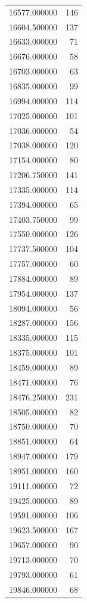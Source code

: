 \begin{tabular}{lr}
16577.000000  &   146 \\
16604.500000  &   137 \\
16633.000000  &    71 \\
16676.000000  &    58 \\
16703.000000  &    63 \\
16835.000000  &    99 \\
16994.000000  &   114 \\
17025.000000  &   101 \\
17036.000000  &    54 \\
17038.000000  &   120 \\
17154.000000  &    80 \\
17206.750000  &   141 \\
17335.000000  &   114 \\
17394.000000  &    65 \\
17403.750000  &    99 \\
17550.000000  &   126 \\
17737.500000  &   104 \\
17757.000000  &    60 \\
17884.000000  &    89 \\
17954.000000  &   137 \\
18094.000000  &    56 \\
18287.000000  &   156 \\
18335.000000  &   115 \\
18375.000000  &   101 \\
18459.000000  &    89 \\
18471.000000  &    76 \\
18476.250000  &   231 \\
18505.000000  &    82 \\
18750.000000  &    70 \\
18851.000000  &    64 \\
18947.000000  &   179 \\
18951.000000  &   160 \\
19111.000000  &    72 \\
19425.000000  &    89 \\
19591.000000  &   106 \\
19623.500000  &   167 \\
19657.000000  &    90 \\
19713.000000  &    70 \\
19793.000000  &    61 \\
19846.000000  &    68 \\

\end{tabular}
